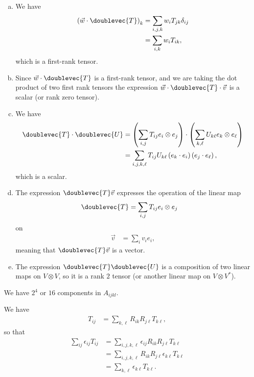 \documentclass[10pt]{mypackage}
\begin{document}
\RaggedRight
\begin{solution}[29.5]\hfill
  \begin{enumerate}[(a)]
    \item We have
      \begin{align*}
        \left( \vec{w}\cdot \doublevec{T} \right)_{k} &= \sum_{i,j,k}w_{i}T_{jk}\delta_{ij}\\
                                   &= \sum_{i,k}w_iT_{ik},
      \end{align*}
      which is a first-rank tensor.
    \item Since $\vec{w}\cdot \doublevec{T}$ is a first-rank tensor, and we are taking the dot product of two first rank tensors the expression $\vec{w}\cdot \doublevec{T}\cdot \vec{v}$ is a scalar (or rank zero tensor).
    \item We have
      \begin{align*}
        \doublevec{T}\cdot \doublevec{U} &= \left( \sum_{i,j}T_{ij}e_i\otimes e_j \right)\cdot \left( \sum_{k,\ell}U_{k\ell} e_{k}\otimes e_{\ell} \right)\\
                                         &= \sum_{i,j,k,\ell}T_{ij}U_{k \ell} \left( e_k\cdot e_i \right)\left( e_j\cdot e_{\ell} \right),
      \end{align*}
      which is a scalar.
    \item The expression $\doublevec{T}\vec{v}$ expresses the operation of the linear map
      \begin{align*}
        \doublevec{T} &= \sum_{i,j}T_{ij}e_i\otimes e_j
      \end{align*}
      on
      \begin{align*}
        \vec{v} &= \sum_{i}v_ie_i,
      \end{align*}
      meaning that $\doublevec{T}\vec{v}$ is a vector.
    \item The expression $\doublevec{T}\doublevec{U}$ is a composition of two linear maps on $V\otimes V$, so it is a rank $2$ tensor (or another linear map on $V\otimes V^{\ast}$).
  \end{enumerate}
\end{solution}
\begin{solution}[29.7]
  We have $2^{4}$ or $16$ components in $A_{ijkl}$.
\end{solution}
\begin{solution}[29.10]
  We have
  \begin{align*}
    T_{ij} &= \sum_{k,\ell}R_{ik}R_{j\ell}T_{k\ell},
  \end{align*}
  so that
  \begin{align*}
    \sum_{ij}\epsilon_{ij}T_{ij} &= \sum_{i,j,k,\ell}\epsilon_{ij}R_{ik}R_{j\ell}T_{k\ell}\\
                                 &= \sum_{i,j,k,\ell}R_{ik}R_{j\ell}\epsilon_{k\ell}T_{k\ell}\\
                                 &= \sum_{k,\ell}\epsilon_{k\ell}T_{k\ell}.
  \end{align*}
\end{solution}
\end{document}
